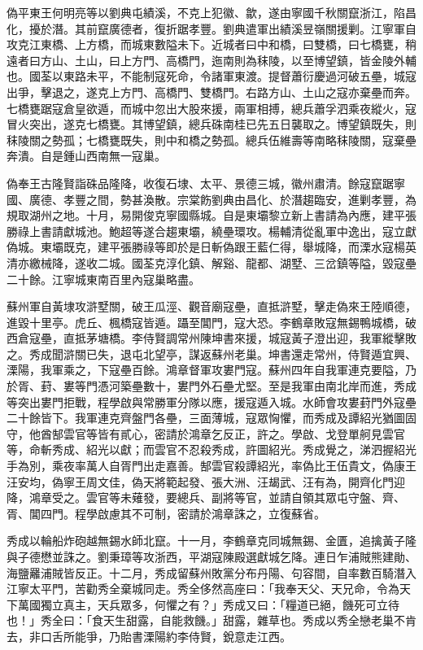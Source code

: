 \begin{pinyinscope}
偽平東王何明亮等以劉典屯績溪，不克上犯徽、歙，遂由寧國千秋關竄浙江，陷昌化，擾於潛。其前竄廣德者，復折踞孝豐。劉典遣軍出績溪昱嶺關援剿。江寧軍自攻克江東橋、上方橋，而城東數隘未下。近城者曰中和橋，曰雙橋，曰七橋甕，稍遠者曰方山、土山，曰上方門、高橋門，迤南則為秣陵，以至博望鎮，皆金陵外輔也。國荃以東路未平，不能制寇死命，令諸軍東渡。提督蕭衍慶過河破五壘，城寇出爭，擊退之，遂克上方門、高橋門、雙橋門。右路方山、土山之寇亦棄壘而奔。七橋甕踞寇倉皇欲遁，而城中忽出大股來援，兩軍相搏，總兵蕭孚泗乘夜縱火，寇冒火突出，遂克七橋甕。其博望鎮，總兵硃南桂已先五日襲取之。博望鎮既失，則秣陵關之勢孤；七橋甕既失，則中和橋之勢孤。總兵伍維壽等南略秣陵關，寇棄壘奔潰。自是鍾山西南無一寇巢。

偽奉王古隆賢詣硃品隆降，收復石埭、太平、景德三城，徽州肅清。餘寇竄踞寧國、廣德、孝豐之間，勢甚渙散。宗棠飭劉典由昌化、於潛趨臨安，進剿孝豐，為規取湖州之地。十月，易開俊克寧國縣城。自是東壩黎立新上書請為內應，建平張勝祿上書請獻城池。鮑超等遂合趨東壩，繞壘環攻。楊輔清從亂軍中逸出，寇立獻偽城。東壩既克，建平張勝祿等即於是日斬偽跟王藍仁得，舉城降，而溧水寇楊英清亦繳械降，遂收二城。國荃克淳化鎮、解谿、龍都、湖墅、三岔鎮等隘，毀寇壘二十餘。江寧城東南百里內寇巢略盡。

蘇州軍自黃埭攻滸墅關，破王瓜涇、觀音廟寇壘，直抵滸墅，擊走偽來王陸順德，進毀十里亭。虎丘、楓橋寇皆遁。躡至閶門，寇大恐。李鶴章敗寇無錫鴨城橋，破西倉寇壘，直抵茅塘橋。李侍賢調常州陳坤書來援，城寇黃子澄出迎，我軍縱擊敗之。秀成聞滸關已失，退屯北望亭，謀返蘇州老巢。坤書還走常州，侍賢遁宜興、溧陽，我軍乘之，下寇壘百餘。鴻章督軍攻婁門寇。蘇州四年自我軍連克要隘，乃於胥、葑、婁等門憑河築壘數十，婁門外石壘尤堅。至是我軍由南北岸而進，秀成等突出婁門拒戰，程學啟與常勝軍分隊以應，援寇遁入城。水師會攻婁葑門外寇壘二十餘皆下。我軍連克齊盤門各壘，三面薄城，寇眾恟懼，而秀成及譚紹光猶圖固守，他酋郜雲官等皆有貳心，密請於鴻章乞反正，許之。學啟、戈登單舸見雲官等，命斬秀成、紹光以獻；而雲官不忍殺秀成，許圖紹光。秀成覺之，涕泗握紹光手為別，乘夜率萬人自胥門出走嘉善。郜雲官殺譚紹光，率偽比王伍貴文，偽康王汪安均，偽寧王周文佳，偽天將範起發、張大洲、汪朅武、汪有為，開齊化門迎降，鴻章受之。雲官等未薙發，要總兵、副將等官，並請自領其眾屯守盤、齊、胥、閶四門。程學啟慮其不可制，密請於鴻章誅之，立復蘇省。

秀成以輪船炸砲越無錫水師北竄。十一月，李鶴章克同城無錫、金匱，追擒黃子隆與子德懋並誅之。劉秉璋等攻浙西，平湖寇陳殿選獻城乞降。連日乍浦賊熊建勛、海鹽䍦浦賊皆反正。十二月，秀成留蘇州敗黨分布丹陽、句容間，自率數百騎潛入江寧太平門，苦勸秀全棄城同走。秀全侈然高座曰：「我奉天父、天兄命，令為天下萬國獨立真主，天兵眾多，何懼之有？」秀成又曰：「糧道已絕，饑死可立待也！」秀全曰：「食天生甜露，自能救饑。」甜露，雜草也。秀成以秀全戀老巢不肯去，非口舌所能爭，乃貽書溧陽約李侍賢，銳意走江西。


\end{pinyinscope}
